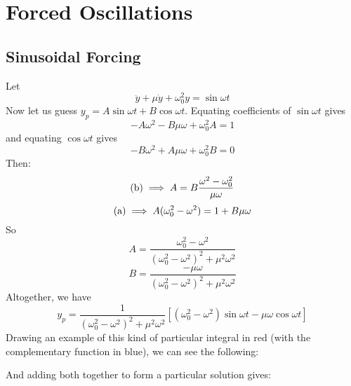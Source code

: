 \documentclass{article}
\begin{document}
	\section{Forced Oscillations}
	\subsection{Sinusoidal Forcing}
	Let
	\[ \ddot y + \mu \dot y + \omega_0^2 y = \sin \omega t \]
	Now let us guess $y_p = A\sin \omega t + B\cos \omega t$. Equating coefficients of $\sin\omega t$ gives
	\[ -A\omega^2 - B\mu\omega + \omega_0^2A = 1 \tag{a} \]
	and equating $\cos\omega t$ gives
	\[ -B\omega^2 + A\mu\omega + \omega_0^2B = 0 \tag{b} \]
	Then:
	\[ (\text b) \implies A = B \frac{\omega^2 - \omega_0^2}{\mu\omega} \]
	\[ (\text a) \implies A(\omega_0^2 - \omega^2) = 1 + B\mu\omega \]
	So
	\[ A = \frac{\omega_0^2 - \omega^2}{(\omega_0^2 - \omega^2)^2 + \mu^2\omega^2} \]
	\[ B = \frac{-\mu\omega}{(\omega_0^2 - \omega^2)^2 + \mu^2\omega^2} \]
	Altogether, we have
	\[ y_p = \frac{1}{(\omega_0^2 - \omega^2)^2 + \mu^2\omega^2}\left[ (\omega_0^2 - \omega^2)\sin\omega t - \mu \omega \cos \omega t \right] \]
	Drawing an example of this kind of particular integral in red (with the complementary function in blue), we can see the following:\medskip


	\noindent And adding both together to form a particular solution gives:\medskip

\end{document}

